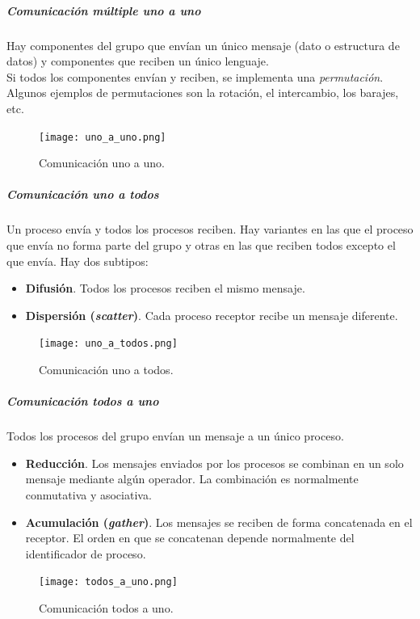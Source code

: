 \documentclass[12pt,spanish]{article}
\begin{document}
\subparagraph{Comunicación múltiple uno a uno}
Hay componentes del grupo que envían un único mensaje (dato o estructura de datos) y componentes que reciben un único lenguaje.\\

Si todos los componentes envían y reciben, se implementa una \emph{permutación}. Algunos ejemplos de permutaciones son la rotación, el intercambio, los barajes, etc.

\begin{figure}[H]
\centering
\texttt{[image: uno\_a\_uno.png]}
\caption{Comunicación uno a uno.}
\end{figure}

\subparagraph{Comunicación uno a todos}


Un proceso envía y todos los procesos reciben. Hay variantes en las que el proceso que envía no forma parte del grupo y otras en las que reciben todos excepto el que envía. Hay dos subtipos:

\begin{itemize}
	\item \textbf{Difusión}. Todos los procesos reciben el mismo mensaje.
	\item \textbf{Dispersión (\textit{scatter})}. Cada proceso receptor recibe un mensaje diferente.	
\end{itemize}

\begin{figure}[H]
\centering
\texttt{[image: uno\_a\_todos.png]}
\caption{Comunicación uno a todos.}
\end{figure}


\subparagraph{Comunicación todos a uno}

Todos los procesos del grupo envían un mensaje a un único proceso.

\begin{itemize}
	\item \textbf{Reducción}. Los mensajes enviados por los procesos se combinan en un solo mensaje mediante algún operador. La combinación es normalmente conmutativa y asociativa.
	\item \textbf{Acumulación (\textit{gather})}. Los mensajes se reciben de forma concatenada en el receptor. El orden en que se concatenan depende normalmente del identificador de proceso.
\end{itemize}

\begin{figure}[H]
\centering
\texttt{[image: todos\_a\_uno.png]}
\caption{Comunicación todos a uno.}
\end{figure}
\end{document}
